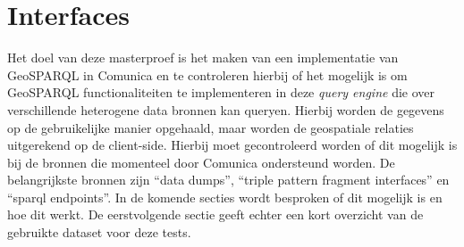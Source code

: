 \chapter{Interfaces}
\label{chap:interfaces}
Het doel van deze masterproef is het maken van een implementatie van GeoSPARQL in Comunica en te controleren hierbij of het mogelijk is om GeoSPARQL functionaliteiten te implementeren in deze \textit{query engine} die over verschillende heterogene data bronnen kan queryen. Hierbij worden de gegevens op de gebruikelijke manier opgehaald, maar worden de geospatiale relaties uitgerekend op de client-side. Hierbij moet gecontroleerd worden of dit mogelijk is bij de bronnen die momenteel door Comunica ondersteund worden. De belangrijkste bronnen zijn ``data dumps'', ``triple pattern fragment interfaces'' en ``sparql endpoints''. In de komende secties wordt besproken of dit mogelijk is en hoe dit werkt. De eerstvolgende sectie geeft echter een kort overzicht van de gebruikte dataset voor deze tests.

 
\newpage
 
\newpage
 
\newpage
 
\newpage
